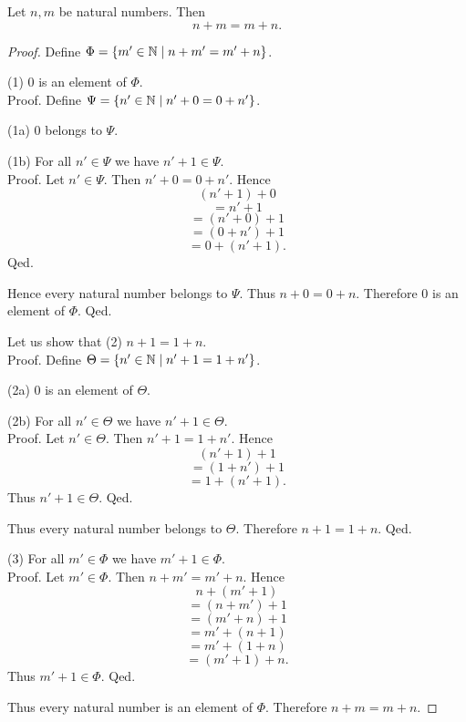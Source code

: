 \documentclass[../arithmetic.tex]{subfiles}
\begin{document}
  \begin{forthel}
    \begin{proposition}
      Let $n, m$ be natural numbers.
      Then \[ n + m = m + n. \]
    \end{proposition}
    \begin{proof}
      Define $\Phi = \{ m' \in \mathbb{N} \mid n + m' = m' + n \}$.

      (1) $0$ is an element of $\Phi$. \\
      Proof.
        Define $\Psi = \{ n' \in \mathbb{N} \mid n' + 0 = 0 + n' \}$.

        (1a) $0$ belongs to $\Psi$.

        (1b) For all $n' \in \Psi$ we have $n' + 1 \in \Psi$. \\
        Proof.
          Let $n' \in \Psi$.
          Then $n' + 0 = 0 + n'$.
          Hence
          \[  (n' + 1) + 0        \]
          \[    = n' + 1          \]
          \[    = (n' + 0) + 1    \]
          \[    = (0 + n') + 1    \]
          \[    = 0 + (n' + 1).   \]
        Qed.

        Hence every natural number belongs to $\Psi$.
        Thus $n + 0 = 0 + n$.
        Therefore $0$ is an element of $\Phi$.
      Qed.

      Let us show that (2) $n + 1 = 1 + n$. \\
      Proof.
        Define $\Theta = \{ n' \in \mathbb{N} \mid n' + 1 = 1 + n' \}$.

        (2a) $0$ is an element of $\Theta$.

        (2b) For all $n' \in \Theta$ we have $n' + 1 \in \Theta$. \\
        Proof.
          Let $n' \in \Theta$.
          Then $n' + 1 = 1 + n'$.
          Hence
          \[  (n' + 1) + 1        \]
          \[    = (1 + n') + 1    \]
          \[    = 1 + (n' + 1).   \]
          Thus $n' + 1 \in \Theta$.
        Qed.

        Thus every natural number belongs to $\Theta$.
        Therefore $n + 1 = 1 + n$.
      Qed.

      (3) For all $m' \in \Phi$ we have $m' + 1 \in \Phi$. \\
      Proof.
        Let $m' \in \Phi$.
        Then $n + m' = m' + n$.
        Hence
        \[  n + (m'  + 1)       \]
        \[    = (n + m') + 1    \]
        \[    = (m' + n) + 1    \]
        \[    = m' + (n + 1)    \]
        \[    = m' + (1 + n)    \]
        \[    = (m' + 1) + n.   \]
        Thus $m' + 1 \in \Phi$.
      Qed.

      Thus every natural number is an element of $\Phi$.
      Therefore $n + m = m + n$.
    \end{proof}
  \end{forthel}
\end{document}
